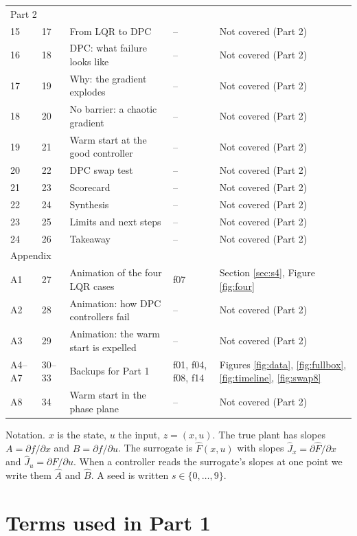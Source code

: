 \documentclass[11pt]{article}
\begin{document}
\begin{center}
\begin{tabular}{lllll}
\midrule
\multicolumn{5}{l}{Part 2} \\
15 & 17 & From LQR to DPC & -- & Not covered (Part 2) \\
16 & 18 & DPC: what failure looks like & -- & Not covered (Part 2) \\
17 & 19 & Why: the gradient explodes & -- & Not covered (Part 2) \\
18 & 20 & No barrier: a chaotic gradient & -- & Not covered (Part 2) \\
19 & 21 & Warm start at the good controller & -- & Not covered (Part 2) \\
20 & 22 & DPC swap test & -- & Not covered (Part 2) \\
21 & 23 & Scorecard & -- & Not covered (Part 2) \\
22 & 24 & Synthesis & -- & Not covered (Part 2) \\
23 & 25 & Limits and next steps & -- & Not covered (Part 2) \\
24 & 26 & Takeaway & -- & Not covered (Part 2) \\
\midrule
\multicolumn{5}{l}{Appendix} \\
A1 & 27 & Animation of the four LQR cases & f07 & Section \ref{sec:s4}, Figure \ref{fig:four} \\
A2 & 28 & Animation: how DPC controllers fail & -- & Not covered (Part 2) \\
A3 & 29 & Animation: the warm start is expelled & -- & Not covered (Part 2) \\
A4--A7 & 30--33 & Backups for Part 1 & f01, f04, f08, f14 & Figures \ref{fig:data}, \ref{fig:fullbox}, \ref{fig:timeline}, \ref{fig:swap8} \\
A8 & 34 & Warm start in the phase plane & -- & Not covered (Part 2) \\
\bottomrule
\end{tabular}
\end{center}

Notation. $x$ is the state, $u$ the input, $z=(x,u)$. The true plant has slopes $A=\partial f/\partial x$ and $B=\partial f/\partial u$. The surrogate is $\hat F(x,u)$ with slopes $\hat J_x=\partial \hat F/\partial x$ and $\hat J_u=\partial \hat F/\partial u$. When a controller reads the surrogate's slopes at one point we write them $\hat A$ and $\hat B$. A seed is written $s\in\{0,\dots,9\}$.

\section{Terms used in Part 1}\label{sec:terms}
\end{document}
